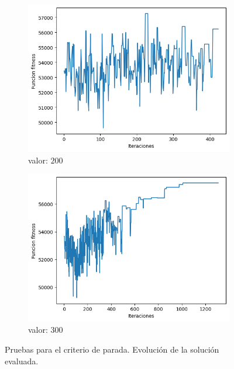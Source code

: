\documentclass[a4paper,12pt]{article}
\begin{document}
\begin{figure}[H]
\begin{subfigure}{0.24\textwidth}
			\includegraphics[width=\textwidth]{include/parada/200/f.png}
			\caption{valor: $200$}
		\end{subfigure}
		\hfill
		\begin{subfigure}{0.24\textwidth}
			\centering
			\includegraphics[width=\textwidth]{include/parada/300/f.png}
			\caption{valor: $300$}
		\end{subfigure}
		\caption{Pruebas para el criterio de parada. Evolución de la solución evaluada.}
	\end{figure}
	
\end{document}
